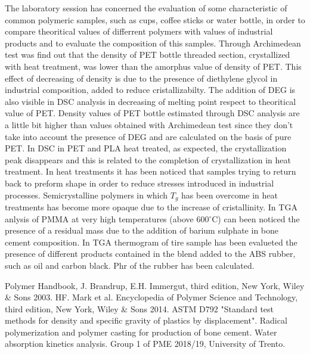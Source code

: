 \documentclass[a4paper, 11pt]{article}
\begin{document}
The laboratory session has concerned the evaluation of some characteristic of common polymeric samples, such as cups, coffee sticks or water bottle, in order to compare theoritical values of  differrent polymers with values of industrial products and  to evaluate the composition of this samples.
Through Archimedean test was find out that the density of PET bottle threaded section, crystallized with heat treatment, was lower than the amorphus value of density of PET. This effect of decreasing of density is due to the presence of diethylene glycol in industrial composition, added to reduce cristallizabilty. 
The addition of DEG is also visible in DSC analysis in decreasing of melting point respect to theoritical value of PET. Density values of PET bottle estimated through DSC analysis are a little bit higher than values obtained with Archimedean test since they don't take into account the presence of DEG and are calculated on the basis of pure PET. 
In DSC in PET and PLA heat treated, as expected, the crystallization peak disappears and this is related to the completion of crystallization in heat treatment. 
In heat treatments it has been noticed that samples trying to return back to preform shape in order to reduce stresses introduced in industrial processes. Semicrystalline polymers in which $T_g$ has been overcome in heat treatments has become more opaque due to the increase of cristallinity. 
In TGA anlysis of PMMA at very high temperatures (above  600$^\circ$C) can been noticed the presence of a residual mass due to the addition of barium sulphate in bone cement composition. In TGA thermogram of tire sample has been evalueted the presence
of different products contained in the blend added to the ABS rubber, such as oil and carbon black. Phr of the rubber has been calculated.  

\newpage
\thispagestyle{empty}

\begin{thebibliography}{1}

 Polymer Handbook, J. Brandrup, E.H. Immergut, third edition, New York, Wiley \& Sons 2003.
 HF. Mark et al. Encyclopedia of Polymer Science and Technology, third edition, New York, Wiley \& Sons 2014.
 ASTM D792 "Standard test methods for density and specific gravity of plastics by displacement".
 Radical polymerization and polymer casting for production of bone cement. Water absorption kinetics analysis. Group 1 of PME 2018/19, University of Trento. 

\end{thebibliography}
\end{document}
